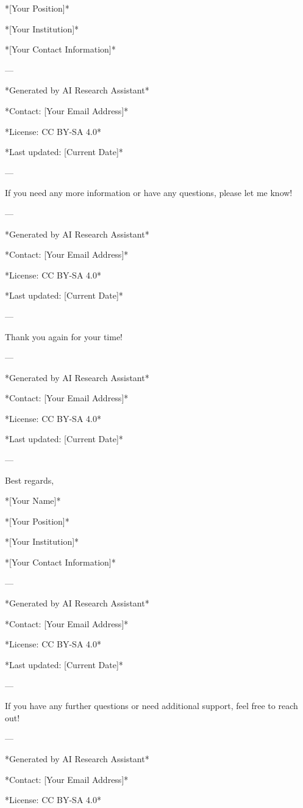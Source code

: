 *[Your Position]* 

*[Your Institution]* 

*[Your Contact Information]* 

--- 

*Generated by AI Research Assistant* 

*Contact: [Your Email Address]* 

*License: CC BY-SA 4.0* 

*Last updated: [Current Date]* 

--- 

If you need any more information or have any questions, please let me know! 

--- 

*Generated by AI Research Assistant* 

*Contact: [Your Email Address]* 

*License: CC BY-SA 4.0* 

*Last updated: [Current Date]* 

--- 

Thank you again for your time! 

--- 

*Generated by AI Research Assistant* 

*Contact: [Your Email Address]* 

*License: CC BY-SA 4.0* 

*Last updated: [Current Date]* 

--- 

Best regards, 

*[Your Name]* 

*[Your Position]* 

*[Your Institution]* 

*[Your Contact Information]* 

--- 

*Generated by AI Research Assistant* 

*Contact: [Your Email Address]* 

*License: CC BY-SA 4.0* 

*Last updated: [Current Date]* 

--- 

If you have any further questions or need additional support, feel free to reach out! 

--- 

*Generated by AI Research Assistant* 

*Contact: [Your Email Address]* 

*License: CC BY-SA 4.0* 

